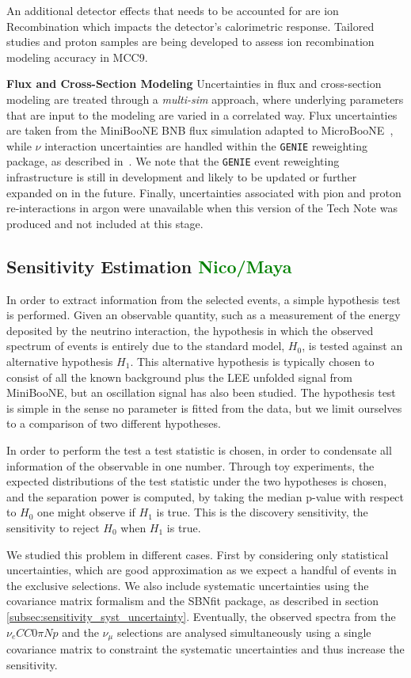 \documentclass[a4paper]{article}
\newcommand{\nueccnopinp}{$\nu_e CC 0\pi Np$ }
\newcommand{\numu}{$\nu_{\mu}$ }
\begin{document}
An additional detector effects that needs to be accounted for are ion Recombination which impacts the detector's calorimetric response. Tailored studies and proton samples are being developed to assess ion recombination modeling accuracy in MCC9.
\par \noindent \textbf{Flux and Cross-Section Modeling} Uncertainties in flux and cross-section modeling are treated through a \emph{multi-sim} approach, where underlying parameters that are input to the modeling are varied in a correlated way. Flux uncertainties are taken from the MiniBooNE BNB flux simulation adapted to MicroBooNE~\cite{bib:fluxmcc9}, while $\nu$ interaction uncertainties are handled within the \texttt{GENIE} reweighting package, as described in~\cite{bib:geniesupportnote}. We note that the \texttt{GENIE} event reweighting infrastructure is still in development and likely to be updated or further expanded on in the future. Finally, uncertainties associated with pion and proton re-interactions in argon were unavailable when this version of the Tech Note was produced and not included at this stage.

\subsection{Sensitivity Estimation \textcolor{green}{Nico/Maya}}
In order to extract information from the selected events, a simple hypothesis test is performed.
Given an observable quantity, such as a measurement of the energy deposited by the neutrino interaction, the hypothesis in which the observed spectrum of events is entirely due to the standard model, $H_0$, is tested against an alternative hypothesis $H_1$.
This alternative hypothesis is typically chosen to consist of all the known background plus the LEE unfolded signal from MiniBooNE, but an oscillation signal has also been studied.
The hypothesis test is simple in the sense no parameter is fitted from the data, but we limit ourselves to a comparison of two different hypotheses.

In order to perform the test a test statistic is chosen, in order to condensate all information of the observable in one number.
Through toy experiments, the expected distributions of the test statistic under the two hypotheses is chosen, and the separation power is computed, by taking the median p-value with respect to $H_0$ one might observe if $H_1$ is true.
This is the discovery sensitivity, the sensitivity to reject $H_0$ when $H_1$ is true.

We studied this problem in different cases.
First by considering only statistical uncertainties, which are good approximation as we expect a handful of events in the exclusive selections.
We also include systematic uncertainties using the covariance matrix formalism and the SBNfit package, as described in section \ref{subsec:sensitivity_syst_uncertainty}.
Eventually, the observed spectra from the \nueccnopinp and the \numu selections are analysed simultaneously using a single covariance matrix to constraint the systematic uncertainties and thus increase the sensitivity.
\end{document}
